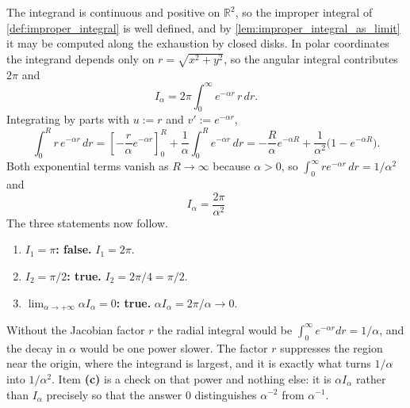 \begin{exercisesolution}
\label{sol:radial_exponential_integral}
The integrand is continuous and positive on $\mathbb{R}^2$, so the improper integral of
\cref{def:improper_integral} is well defined, and by \cref{lem:improper_integral_as_limit} it may
be computed along the exhaustion by closed disks. In polar coordinates the integrand depends only
on $r = \sqrt{x^2+y^2}$, so the angular integral contributes $2\pi$ and
\[I_\alpha = 2\pi\int_0^\infty e^{-\alpha r}\,r\,dr .\]
Integrating by parts with $u := r$ and $v' := e^{-\alpha r}$,
\[\int_0^R r\,e^{-\alpha r}\,dr
  = \left[-\frac{r}{\alpha}e^{-\alpha r}\right]_0^R + \frac{1}{\alpha}\int_0^R e^{-\alpha r}\,dr
  = -\frac{R}{\alpha}e^{-\alpha R} + \frac{1}{\alpha^2}\big(1 - e^{-\alpha R}\big).\]
Both exponential terms vanish as $R \to \infty$ because $\alpha > 0$, so
$\int_0^\infty r e^{-\alpha r}\,dr = 1/\alpha^2$ and
\[\boxed{\;I_\alpha = \frac{2\pi}{\alpha^2}\;}\]
The three statements now follow.
\begin{enumerate}[label=\textbf{(\alph*)}]
  \item \textbf{$I_1 = \pi$: false.} $I_1 = 2\pi$.
  \item \textbf{$I_2 = \pi/2$: true.} $I_2 = 2\pi/4 = \pi/2$.
  \item \textbf{$\lim_{\alpha\to+\infty}\alpha I_\alpha = 0$: true.} $\alpha I_\alpha = 2\pi/\alpha
    \to 0$.
\end{enumerate}
\begin{remark}
Without the Jacobian factor $r$ the radial integral would be $\int_0^\infty e^{-\alpha r}dr =
1/\alpha$, and the decay in $\alpha$ would be one power slower. The factor $r$ suppresses the
region near the origin, where the integrand is largest, and it is exactly what turns $1/\alpha$
into $1/\alpha^2$. Item \textbf{(c)} is a check on that power and nothing else: it is
$\alpha I_\alpha$ rather than $I_\alpha$ precisely so that the answer $0$ distinguishes
$\alpha^{-2}$ from $\alpha^{-1}$.
\end{remark}
\end{exercisesolution}

